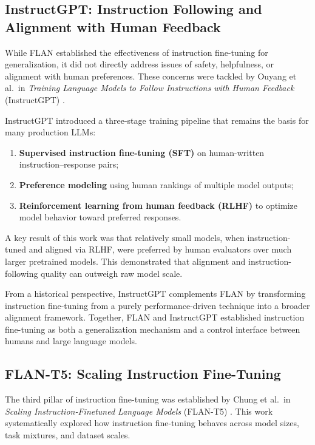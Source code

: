 \documentclass[unnumsec,webpdf,contemporary,large]{oup-authoring-template}
\theoremstyle{thmstyleone}
\theoremstyle{thmstyletwo}
\theoremstyle{thmstylethree}
\begin{document}
\subsection{InstructGPT: Instruction Following and Alignment with Human Feedback}

While FLAN established the effectiveness of instruction fine-tuning for generalization, it did not directly address issues of safety, helpfulness, or alignment with human preferences. These concerns were tackled by Ouyang et al.\ in \emph{Training Language Models to Follow Instructions with Human Feedback} (InstructGPT) \cite{ouyang2022instructgpt}.

InstructGPT introduced a three-stage training pipeline that remains the basis for many production LLMs:
\begin{enumerate}
  \item \textbf{Supervised instruction fine-tuning (SFT)} on human-written instruction--response pairs;
  \item \textbf{Preference modeling} using human rankings of multiple model outputs;
  \item \textbf{Reinforcement learning from human feedback (RLHF)} to optimize model behavior toward preferred responses.
\end{enumerate}

A key result of this work was that relatively small models, when instruction-tuned and aligned via RLHF, were preferred by human evaluators over much larger pretrained models. This demonstrated that alignment and instruction-following quality can outweigh raw model scale.

From a historical perspective, InstructGPT complements FLAN by transforming instruction fine-tuning from a purely performance-driven technique into a broader alignment framework. Together, FLAN and InstructGPT established instruction fine-tuning as both a generalization mechanism and a control interface between humans and large language models.

\subsection{FLAN-T5: Scaling Instruction Fine-Tuning}

The third pillar of instruction fine-tuning was established by Chung et al.\ in \emph{Scaling Instruction-Finetuned Language Models} (FLAN-T5) \cite{chung2022flant5}. This work systematically explored how instruction fine-tuning behaves across model sizes, task mixtures, and dataset scales.
\end{document}
